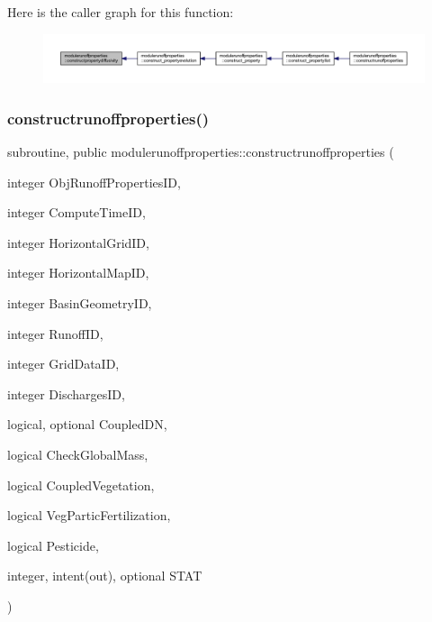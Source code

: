 Here is the caller graph for this function\+:\nopagebreak
\begin{figure}[H]
\begin{center}
\leavevmode
\includegraphics[width=350pt]{namespacemodulerunoffproperties_abe332d8f07a02030f5b0712c32f01262_icgraph}
\end{center}
\end{figure}
\mbox{\label{namespacemodulerunoffproperties_a9b600e1ea55d398dd1ac832de05eccba}} 
\subsubsection{\texorpdfstring{constructrunoffproperties()}{constructrunoffproperties()}}
{\footnotesize\ttfamily subroutine, public modulerunoffproperties\+::constructrunoffproperties (\begin{DoxyParamCaption}\item[{integer}]{Obj\+Runoff\+Properties\+ID,  }\item[{integer}]{Compute\+Time\+ID,  }\item[{integer}]{Horizontal\+Grid\+ID,  }\item[{integer}]{Horizontal\+Map\+ID,  }\item[{integer}]{Basin\+Geometry\+ID,  }\item[{integer}]{Runoff\+ID,  }\item[{integer}]{Grid\+Data\+ID,  }\item[{integer}]{Discharges\+ID,  }\item[{logical, optional}]{Coupled\+DN,  }\item[{logical}]{Check\+Global\+Mass,  }\item[{logical}]{Coupled\+Vegetation,  }\item[{logical}]{Veg\+Partic\+Fertilization,  }\item[{logical}]{Pesticide,  }\item[{integer, intent(out), optional}]{S\+T\+AT }\end{DoxyParamCaption})}

